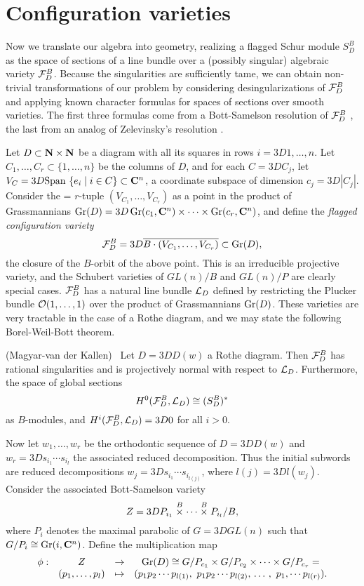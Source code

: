 \section{Configuration varieties}

Now we translate our algebra into geometry, realizing a
flagged Schur module $S_D^B$ as the space of sections
of a line bundle over a (possibly singular) algebraic
variety ${ \cal F }_D^B$.  Because the singularities are sufficiently
tame, we can obtain non-trivial transformations of our problem
by considering desingularizations of ${ \cal F }_D^B$ and applying known
character formulas for spaces of sections over smooth varieties.
The first three formulas come from a Bott-Samelson resolution
of ${ \cal F }_D^B$ \cite{De1}, the last from an analog of Zelevinsky's resolution
\cite{Zel}.

Let $D \subset {\bf N} \times {\bf N}$ be a diagram with all its
squares in rows $i =3D 1,\ldots,n$.  Let $C_1,\ldots,C_r \subset
\{1,\ldots,n\}$ be the columns of $D$, and for each $C =3D C_j$,
let $V_C =3D \mbox{Span }\{e_i \mid i \in C\} \subset {\bf C}^n$,
a coordinate subspace of dimension $c_j =3D |C_j|$.  Consider the =
$r$-tuple
$(V_{C_1},\ldots,V_{C_r})$ as a point in the product of Grassmannians
$\mathop{\rm Gr}(D) =3D \mathop{\rm Gr}(c_1, {\bf C}^n) \times \cdots \times \mathop{\rm Gr}(c_r, {\bf C}^n)$,
and define the {\em flagged configuration variety}
$$
{ \cal F }_D^B =3D \overline{B \cdot (V_{C_1},\ldots,V_{C_r})}
\subset \mathop{\rm Gr}(D) ,
$$
the closure of the $B$-orbit of the above point.
This is an irreducible projective variety, and the
Schubert varieties of $GL(n)/B$ and $GL(n)/P$ are clearly
special cases.
${ \cal F }_D^B$ has a natural line bundle ${\cal L}_D$ defined by restricting
the Plucker bundle ${\cal O}(1,\ldots,1)$ over the product of Grassmannians
$\mathop{\rm Gr}(D)$.
These varieties are very tractable in the case of a Rothe diagram,
and we may state the following Borel-Weil-Bott theorem.

\begin{thm}{(Magyar-van der Kallen)\ }
Let $D =3D D(w)$ a Rothe diagram.  Then ${ \cal F }_D^B$ has rational
singularities and is projectively normal with respect to ${\cal L}_D$.
Furthermore, the space of global sections
$$
H^0({ \cal F }_D^B,{\cal L}_D) \cong (S_D^B)^*
$$
as $B$-modules, and $H^i({ \cal F }_D^B,{\cal L}_D) =3D 0$ for all $i>0$.
\end{thm}


Now let $w_1, \ldots, w_r$ be the orthodontic sequence of
$D =3D D(w)$ and $w_r =3D s_{i_1} \cdots s_{i_l}$ the associated
reduced decomposition.  Thus the initial subwords are reduced
decompositions $w_j =3D s_{i_1} \cdots s_{i_{l(j)}}$,
where $l(j) =3D l(w_j)$.
Consider the associated Bott-Samelson variety \cite{De1}
$$
Z =3D P_{i_1} \stackrel{B}{\times} \cdots \stackrel{B}{\times} P_{i_l} / B ,
$$
where $P_i$ denotes the maximal parabolic of $G =3D GL(n)$ such that
$G/P_i \cong \mathop{\rm Gr}(i,{\bf C}^n)$.  Define the multiplication map
$$
\begin{array}{cccc}
\phi : & Z & \rightarrow &
\mathop{\rm Gr}(D) \cong G/P_{c_1} \times G/P_{c_2} \times \cdots \times G/P_{c_r} =
\\
& (p_1,\ldots,p_l) & \mapsto &
( p_1 p_2 \cdots p_{l(1)},\  p_1 p_2 \cdots p_{l(2)},\,
\ldots \, , \ p_1,\cdots p_{l(r)}) .
\end{array}
$$

